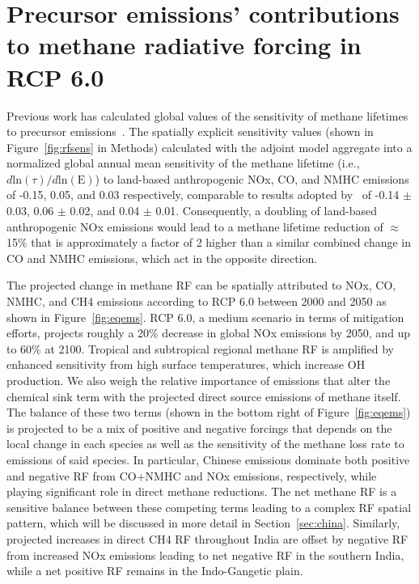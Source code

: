\section{Precursor emissions' contributions to methane radiative forcing in RCP 6.0}

Previous work has calculated global values of the sensitivity of methane lifetimes to precursor emissions~\citep{ref:fry2012,ref:holmes2013}. The spatially explicit sensitivity values (shown in Figure~\ref{fig:rfsens} in Methods) calculated with the adjoint model aggregate into a normalized global annual mean sensitivity of the methane lifetime (i.e., $d \mathrm{ln}(\tau)/d\mathrm{ln}(\mathrm{E})$) to land-based anthropogenic NOx, CO, and NMHC emissions of -0.15, 0.05, and 0.03 respectively, comparable to results adopted by~\citet{ref:holmes2013} of -0.14 $\pm$ 0.03, 0.06 $\pm$ 0.02, and 0.04 $\pm$ 0.01. Consequently, a doubling of land-based anthropogenic NOx emissions would lead to a methane lifetime reduction of $\approx$ 15\% that is approximately a factor of 2 higher than a similar combined change in CO and NMHC emissions, which act in the opposite direction.  


The projected change in methane RF can be spatially attributed to NOx, CO, NMHC, and CH4 emissions according to RCP 6.0 between 2000 and 2050 as shown in Figure~\ref{fig:eqems}. RCP 6.0, a medium scenario in terms of mitigation efforts, projects roughly a 20\% decrease in global NOx emissions by 2050, and up to 60\% at 2100. Tropical and subtropical regional methane RF is amplified by enhanced sensitivity from high surface temperatures, which increase OH production. We also weigh the relative importance of emissions that alter the chemical sink term with the projected direct source emissions of methane itself. The balance of these two terms (shown in the bottom right of Figure~\ref{fig:eqems}) is projected to be a mix of positive and negative forcings that depends on the local change in each species as well as the sensitivity of the methane loss rate to emissions of said species. In particular, Chinese emissions dominate both positive and negative RF from CO+NMHC and NOx emissions, respectively, while playing significant role in direct methane reductions.  The net methane RF is a sensitive balance between these competing terms leading to a complex RF spatial pattern, which will be discussed in more detail in Section~\ref{sec:china}.  Similarly, projected increases in direct CH4 RF throughout India are offset by negative RF from increased NOx emissions leading to net negative RF in the southern India, while a net positive RF remains in the Indo-Gangetic plain.  

